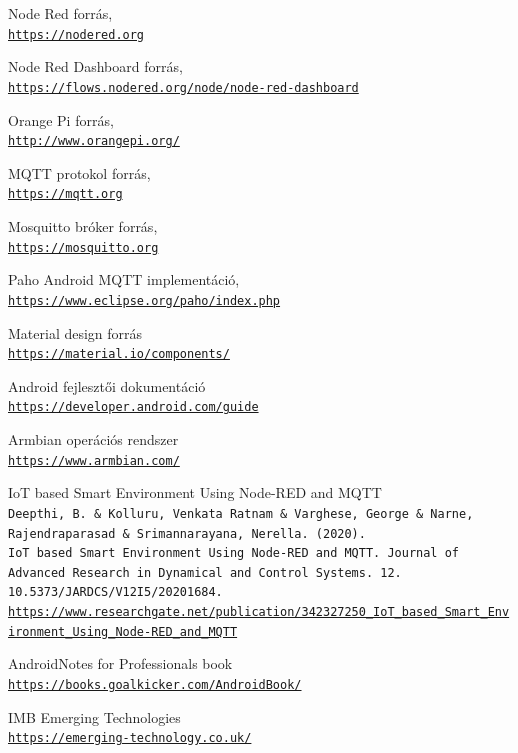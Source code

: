 \documentclass[
]{thesis-ekf}
\theoremstyle{definition}
\theoremstyle{remark}
\begin{document}
\begin{thebibliography}{2}
Node Red forrás,
\\\texttt{\url{https://nodered.org}}

Node Red Dashboard forrás,
\\\texttt{\url{https://flows.nodered.org/node/node-red-dashboard}}

Orange Pi forrás,
\\\texttt{\url{http://www.orangepi.org/}}

MQTT protokol forrás,
\\\texttt{\url{https://mqtt.org}}

Mosquitto bróker forrás,
\\\texttt{\url{https://mosquitto.org}}

Paho Android MQTT implementáció,
\\\texttt{\url{https://www.eclipse.org/paho/index.php}}

Material design forrás
\\\texttt{\url{https://material.io/components/}}

Android fejlesztői dokumentáció
\\\texttt{\url{https://developer.android.com/guide}}

Armbian operációs rendszer
\\\texttt{\url{https://www.armbian.com/}}

IoT based Smart Environment Using Node-RED and MQTT
\\\texttt{Deepthi, B. \& Kolluru, Venkata Ratnam \& Varghese, George \& Narne, Rajendraparasad \& Srimannarayana, Nerella. (2020).}
\\\texttt{IoT based Smart Environment Using Node-RED and MQTT. Journal of Advanced Research in Dynamical and Control Systems. 12. 10.5373/JARDCS/V12I5/20201684.}
\\\texttt{\url{https://www.researchgate.net/publication/342327250_IoT_based_Smart_Environment_Using_Node-RED_and_MQTT}}
	
Android\texttrademark Notes for Professionals book
\\\texttt{\url{https://books.goalkicker.com/AndroidBook/}}

IMB Emerging Technologies
\\\texttt{\url{https://emerging-technology.co.uk/}}


\end{thebibliography}
\end{document}
